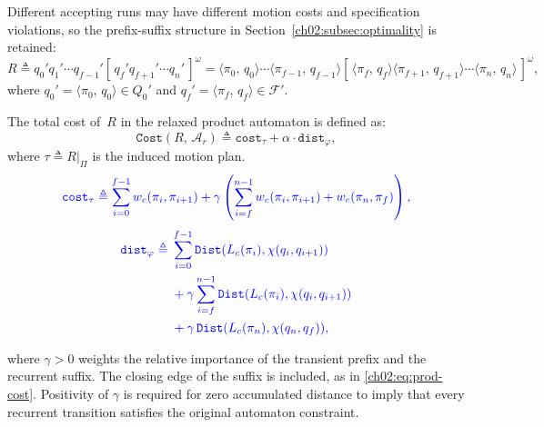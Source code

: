 \begin{revision}
Different accepting runs may have different motion costs and specification
violations, so the prefix-suffix structure in
Section~\ref{ch02:subsec:optimality} is retained:
\[
R \triangleq q_0' q_1' \cdots q_{f-1}'
[\, q_f' q_{f+1}' \cdots q_n' \,]^{\omega}
= \langle \pi_0,\, q_0 \rangle \cdots
\langle \pi_{f-1},\, q_{f-1} \rangle
[\, \langle \pi_f,\, q_f \rangle
\langle \pi_{f+1},\, q_{f+1} \rangle \cdots
\langle \pi_n,\, q_n \rangle \,]^{\omega},
\]
where $q_0' = \langle \pi_0,\, q_0 \rangle \in Q_0'$ and
$q_f' = \langle \pi_f,\, q_f \rangle \in \mathcal{F}'$.
\end{revision}
The total cost of~$R$ in the relaxed product automaton is defined as:
\begin{equation}
\texttt{Cost}(R,\, \mathcal{A}_r)
\triangleq \texttt{cost}_{\tau}
+ \alpha \cdot \texttt{dist}_{\varphi},
\label{ch03:eq:prod-cost2}
\end{equation}
where $\tau \triangleq R|_{\Pi}$ is the induced motion plan. 
\begin{equation}
\color{blue}
\texttt{cost}_{\tau} \triangleq
\sum_{i=0}^{f-1}w_c(\pi_i,\pi_{i+1})
+\gamma\left(\sum_{i=f}^{n-1}w_c(\pi_i,\pi_{i+1})
+w_c(\pi_n,\pi_f)\right),
\label{ch03:eq:cost}
\end{equation}
\begin{equation}
\color{blue}
\begin{aligned}
\texttt{dist}_{\varphi}\triangleq {}&
\sum_{i=0}^{f-1}\texttt{Dist}(L_c(\pi_i),\chi(q_i,q_{i+1})) \\
&+\gamma\sum_{i=f}^{n-1}\texttt{Dist}(L_c(\pi_i),\chi(q_i,q_{i+1})) \\
&+\gamma\,\texttt{Dist}(L_c(\pi_n),\chi(q_n,q_f)),
\end{aligned}
\label{ch03:eq:dist}
\end{equation}
\begin{revision}
where $\gamma>0$ weights the relative importance of the transient prefix
and the recurrent suffix. The closing edge of the suffix is included,
as in \eqref{ch02:eq:prod-cost}. Positivity of $\gamma$ is required for
zero accumulated distance to imply that every recurrent transition
satisfies the original automaton constraint.
\end{revision}

